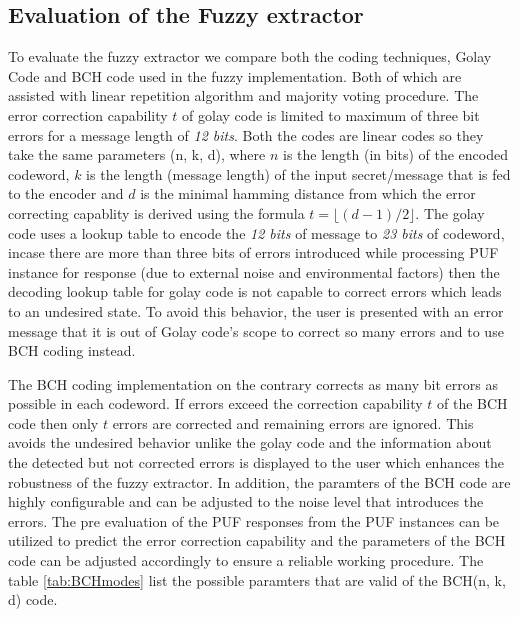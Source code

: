\subsection{Evaluation of the Fuzzy extractor}
To evaluate the fuzzy extractor we compare both the coding techniques, Golay Code and BCH code used in the fuzzy implementation. Both of which are assisted with linear repetition algorithm and majority voting procedure. The error correction capability $t$ of golay code is limited to maximum of three bit errors for a message length of \emph{12 bits}. Both the codes are linear codes so they take the same parameters (n, k, d), where $n$ is the length (in bits) of the encoded codeword, $k$ is the
length (message length) of the input secret/message that is fed to the encoder and $d$ is the minimal hamming distance from which the error correcting capablity is derived using the formula $t = \lfloor(d-1)/2\rfloor$. The golay code uses a lookup table to encode the \emph{12 bits} of message to \emph{23 bits} of codeword, incase there are more than three bits of errors introduced while processing PUF instance for response (due to external noise and environmental factors) then the decoding lookup
table for golay code is not capable to correct errors which leads to an undesired state. To avoid this behavior, the user is presented with an error message that it is out of Golay code's scope to correct so many errors and to use BCH coding instead.

The BCH coding implementation on the contrary corrects as many bit errors as possible in each codeword. If errors exceed the correction capability $t$ of the BCH code then only $t$ errors are corrected and remaining errors are ignored. This avoids the undesired behavior unlike the golay code and the information about the detected but not corrected errors is displayed to the user which enhances the robustness of the fuzzy extractor. In addition, the paramters of the BCH code are
highly configurable and can be adjusted to the noise level that introduces the errors. The pre evaluation of the PUF responses from the PUF instances can be utilized to predict the error correction capability and the parameters of the BCH code can be adjusted accordingly to ensure a reliable working procedure. The table \ref{tab:BCHmodes} list the possible paramters that are valid of the BCH(n, k, d) code.\\

